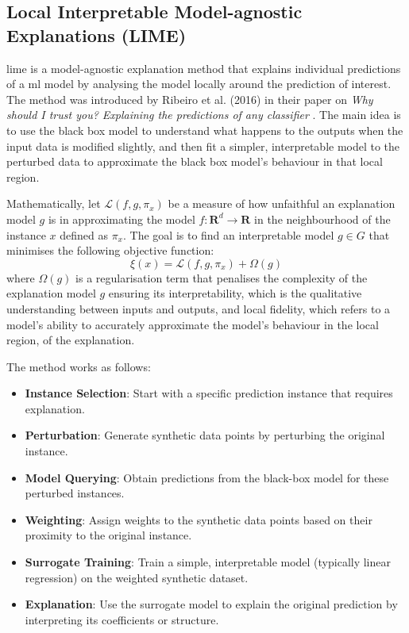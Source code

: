 \subsection{Local Interpretable Model-agnostic Explanations (LIME)} \label{sec:lime}

\acrfull{lime} is a model-agnostic explanation method that explains individual predictions of a \acrlong{ml} model by analysing the model locally around the prediction of interest. The method was introduced by Ribeiro et al. (2016) in their paper on \textit{Why should I trust you? Explaining the predictions of any classifier} \cite{Ribeiro2016}. The main idea is to use the black box model to understand what happens to the outputs when the input data is modified slightly, and then fit a simpler, interpretable model to the perturbed data to approximate the black box model's behaviour in that local region.

Mathematically, let $\mathcal{L}(f,g,\pi_x)$ be a measure of how unfaithful an explanation model $g$ is in approximating the model $f:\mathbf{R}^d \to \mathbf{R}$ in the neighbourhood of the instance $x$ defined as $\pi_x$. The goal is to find an interpretable model $g \in G$ that minimises the following objective function:
\begin{equation}
    \xi(x) = \mathcal{L}(f, g, \pi_x) + \Omega(g)
\end{equation}
where $\Omega(g)$ is a regularisation term that penalises the complexity of the explanation model $g$ ensuring its interpretability, which is the qualitative understanding between inputs and outputs, and local fidelity, which refers to a model's ability to accurately approximate the model's behaviour in the local region, of the explanation. 

The method works as follows:
\begin{itemize}
    \item \textbf{Instance Selection}: Start with a specific prediction instance that requires explanation.
    \item \textbf{Perturbation}: Generate synthetic data points by perturbing the original instance.
    \item \textbf{Model Querying}: Obtain predictions from the black-box model for these perturbed instances.
    \item \textbf{Weighting}: Assign weights to the synthetic data points based on their proximity to the original instance.
    \item \textbf{Surrogate Training}: Train a simple, interpretable model (typically linear regression) on the weighted synthetic dataset.
    \item \textbf{Explanation}: Use the surrogate model to explain the original prediction by interpreting its coefficients or structure.
\end{itemize}

